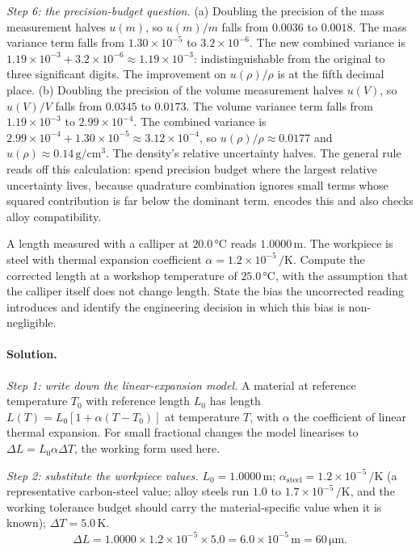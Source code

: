 \emph{Step 6: the precision-budget question.}
(a) Doubling the precision of the mass measurement halves $u(m)$,
so $u(m)/m$ falls from $0.0036$ to $0.0018$. The mass variance
term falls from $1.30 \times 10^{-5}$ to $3.2 \times 10^{-6}$. The
new combined variance is $1.19 \times 10^{-3} + 3.2 \times 10^{-6}
\approx 1.19 \times 10^{-3}$: indistinguishable from the original
to three significant digits. The improvement on $u(\rho)/\rho$
is at the fifth decimal place.
(b) Doubling the precision of the volume measurement halves
$u(V)$, so $u(V)/V$ falls from $0.0345$ to $0.0173$. The volume
variance term falls from $1.19 \times 10^{-3}$ to $2.99 \times
10^{-4}$. The combined variance is $2.99 \times 10^{-4} + 1.30
\times 10^{-5} \approx 3.12 \times 10^{-4}$, so $u(\rho)/\rho
\approx 0.0177$ and $u(\rho) \approx 0.14 \,\si{\gram\per\centi
\meter\cubed}$. The density's relative uncertainty halves.
The general rule reads off this calculation: spend precision
budget where the largest relative uncertainty lives, because
quadrature combination ignores small terms whose squared
contribution is far below the dominant term.
encodes this and also checks alloy compatibility.

\begin{exercise}
A length measured with a calliper at $20.0 \,\si{\degreeCelsius}$
reads $1.0000 \,\si{\meter}$. The workpiece is steel with thermal
expansion coefficient $\alpha = 1.2 \times 10^{-5} \,\si{\per
\kelvin}$. Compute the corrected length at a workshop temperature of
$25.0 \,\si{\degreeCelsius}$, with the assumption that the calliper
itself does not change length. State the bias the uncorrected
reading introduces and identify the engineering decision in which
this bias is non-negligible.
\end{exercise}

\paragraph{Solution.}

\emph{Step 1: write down the linear-expansion model.}
A material at reference temperature $T_{0}$ with reference length
$L_{0}$ has length $L(T) = L_{0} [1 + \alpha (T - T_{0})]$ at
temperature $T$, with $\alpha$ the coefficient of linear thermal
expansion. For small fractional changes the model linearises to
$\Delta L = L_{0} \alpha \Delta T$, the working form used here.

\emph{Step 2: substitute the workpiece values.}
$L_{0} = 1.0000 \,\si{\meter}$; $\alpha_{\mathrm{steel}} = 1.2
\times 10^{-5} \,\si{\per\kelvin}$ (a representative carbon-steel
value; alloy steels run $1.0$ to $1.7 \times 10^{-5} \,\si{\per
\kelvin}$, and the working tolerance budget should carry the
material-specific value when it is known); $\Delta T = 5.0 \,\si
{\kelvin}$.
\[
\Delta L = 1.0000 \times 1.2 \times 10^{-5} \times 5.0 = 6.0
\times 10^{-5} \,\si{\meter} = 60 \,\si{\micro\meter}.
\]

